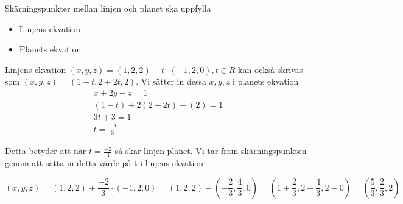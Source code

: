 \documentclass[../../main.tex]{subfiles}
\begin{document}
\begin{solution}{14}

Skärningspunkter mellan linjen och planet ska uppfylla
\begin{itemize}
    \item Linjens ekvation
    \item Planets ekvation
\end{itemize}

Linjens ekvation $(x, y, z) = (1, 2, 2) + t \cdot (-1, 2, 0), t \in R$ kan också skrivas som $(x, y, z) = (1-t, 2+2t, 2)$. Vi sätter in dessa $x, y, z$ i planets ekvation
\begin{align*}
x + 2y - z = 1 \\
(1-t) + 2(2 +2t) - (2) = 1 \\
3t + 3 = 1 \\
t = \frac{-2}{3}
\end{align*}

Detta betyder att när $t = \frac{-2}{3}$ så skär linjen planet. Vi tar fram skärningspunkten genom att sätta in detta värde på t i linjens ekvation

\[(x, y, z) = (1, 2, 2) + \frac{-2}{3} \cdot (-1, 2, 0) = (1, 2, 2) - (-\frac{2}{3}, \frac{4}{3}, 0) = (1 + \frac{2}{3}, 2 - \frac{4}{3}, 2 - 0) = (\frac{5}{3}, \frac{2}{3}, 2)\]

\end{solution}
\end{document}
